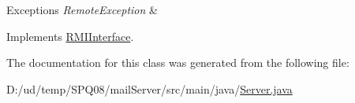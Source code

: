 \begin{DoxyExceptions}{Exceptions}
{\em Remote\+Exception} & \\
\hline
\end{DoxyExceptions}


Implements \hyperlink{interface_r_m_i_interface_a643b5963469fbc121032c7d75c01c7b9}{R\+M\+I\+Interface}.



The documentation for this class was generated from the following file\+:\begin{DoxyCompactItemize}
\item 
D\+:/ud/temp/\+S\+P\+Q08/mail\+Server/src/main/java/\hyperlink{_server_8java}{Server.\+java}\end{DoxyCompactItemize}
